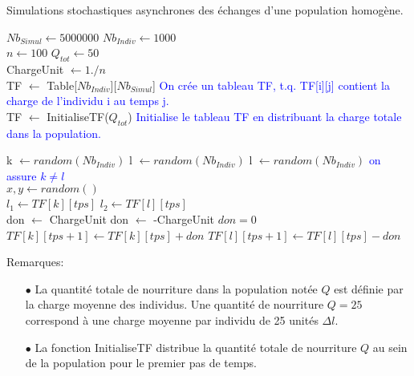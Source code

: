 \begin{algorithm}
\caption{Simulations stochastiques asynchrones des échanges d'une population homogène.}
\begin{algorithmic}

\State $Nb_{Simul} \gets 5 000 000$
\State $Nb_{Indiv} \gets 1000$\\

\State $n \gets 100$
\State $Q_{tot} \gets 50$\\

\State ChargeUnit $\gets 1./n$\\


\State TF $\gets$ Table[$Nb_{Indiv}$][$Nb_{Simul}$]
\State \textcolor{blue}{On crée un tableau TF, t.q. TF[i][j] contient la charge de l'individu i au temps j.}\\
\State TF $\gets$ InitialiseTF($Q_{tot}$)
\State \textcolor{blue}{Initialise le tableau TF en distribuant la charge totale dans la population.}\\

	
	\State k $\gets random(Nb_{Indiv})$
	\State l $\gets random(Nb_{Indiv})$
		\State l $\gets random(Nb_{Indiv})$
	\EndWhile
	\State \textcolor{blue}{on assure $k \neq l$}\\
		
	\State $x,y \gets random()$\\
		
	\State $l_1 \gets TF[k][tps]$
	\State $l_2 \gets TF[l][tps]$\\
		
		\State don $\gets$ ChargeUnit 
		\State don $\gets$ -ChargeUnit 
	\Else
		\State $don=0$
	\EndIf \\
		
	\State $TF[k][tps+1] \gets TF[k][tps]+don$
    \State $TF[l][tps+1] \gets TF[l][tps]-don$\\
\EndFor



\end{algorithmic}
\end{algorithm}


Remarques:
\begin{itemize}
\item[$\bullet$]La quantité totale de nourriture dans la population notée $Q$ est définie par la charge moyenne des individus. Une quantité de nourriture $Q=25$ correspond à une charge moyenne par individu de 25 unités $\Delta l$.
\item[$\bullet$]La fonction InitialiseTF distribue la quantité totale de nourriture $Q$ au sein de la population pour le premier pas de temps.
\end{itemize}


